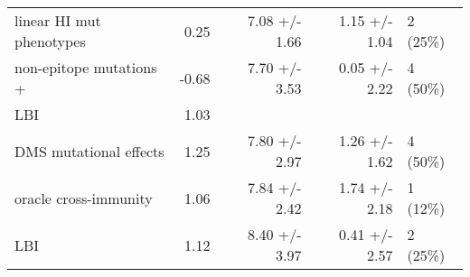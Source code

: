 \begin{tabular*}{1.0\textwidth}{lrrrl}
          linear HI mut phenotypes &         0.25 &                          7.08 +/- 1.66 &                                   1.15 +/- 1.04 &                               2 (25\%) \\
           non-epitope mutations + &        -0.68 &                          7.70 +/- 3.53 &                                   0.05 +/- 2.22 &                               4 (50\%) \\
                   \hspace{3mm}LBI &         1.03 &                                        &                                                 &                                        \\
            DMS mutational effects &         1.25 &                          7.80 +/- 2.97 &                                   1.26 +/- 1.62 &                               4 (50\%) \\
             oracle cross-immunity &         1.06 &                          7.84 +/- 2.42 &                                   1.74 +/- 2.18 &                               1 (12\%) \\
                               LBI &         1.12 &                          8.40 +/- 3.97 &                                   0.41 +/- 2.57 &                               2 (25\%) \\
\bottomrule
\end{tabular*}
